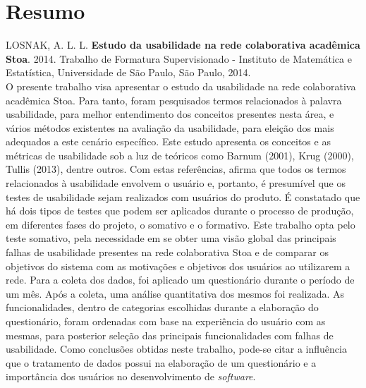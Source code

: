 \documentclass[11pt,twoside,a4paper]{book}
\begin{document}
\chapter*{Resumo}

\noindent LOSNAK, A. L. L. \textbf{Estudo da usabilidade na rede colaborativa acadêmica Stoa}. 
2014.
Trabalho de Formatura Supervisionado - Instituto de Matemática e Estatística,
Universidade de São Paulo, São Paulo, 2014.
\\

O presente trabalho visa apresentar o estudo da usabilidade na rede colaborativa acadêmica Stoa. Para tanto, foram pesquisados
termos relacionados à palavra usabilidade, para melhor entendimento dos conceitos presentes nesta área, e vários métodos 
existentes na avaliação da usabilidade, para eleição dos mais adequados a este cenário específico. 
Este estudo apresenta os conceitos e as métricas de usabilidade sob a luz de teóricos como Barnum (2001), Krug (2000), 
Tullis (2013), dentre outros. Com estas referências, afirma que todos os termos relacionados à usabilidade envolvem o usuário
e, portanto, é presumível que os testes de usabilidade sejam realizados com usuários do produto. 
É constatado que há dois tipos de testes que podem ser aplicados durante o processo de produção, em diferentes fases do 
projeto, o somativo e o formativo. Este trabalho opta pelo teste somativo, pela necessidade em se obter uma visão global das
principais falhas de usabilidade presentes na rede colaborativa Stoa e de comparar os objetivos do sistema com as motivações
e objetivos dos usuários ao utilizarem a rede. 
Para a coleta dos dados, foi aplicado um questionário durante o período de um mês. Após a coleta, uma análise quantitativa dos
mesmos foi realizada. As funcionalidades, dentro de categorias escolhidas durante a elaboração do questionário, foram ordenadas
com base na experiência do usuário com as mesmas, para posterior seleção das principais funcionalidades com falhas de 
usabilidade. Como conclusões obtidas neste trabalho, pode-se citar a influência que o tratamento de dados possui na elaboração de um questionário e a importância dos usuários no desenvolvimento de \emph{software}.
\\
\end{document}

